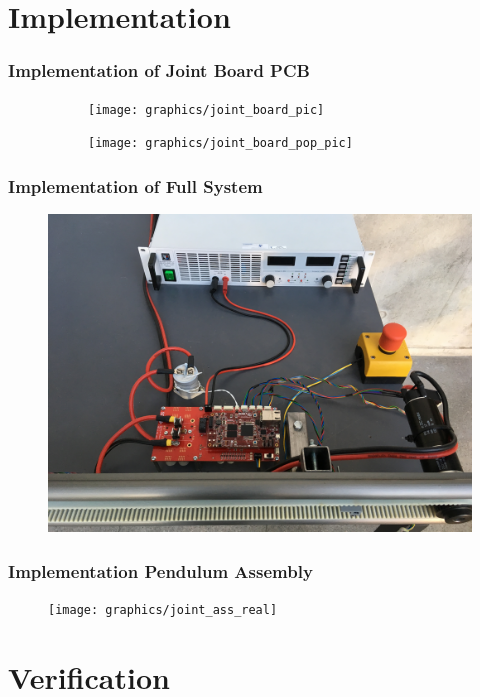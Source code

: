 \documentclass[mathserif]{beamer}
\begin{document}
\section{Implementation}

\begin{frame}[c]\frametitle{Implementation of Joint Board PCB}
\begin{figure}
	\centering
	\begin{subfigure}{.5\textwidth}
	  \centering
	  \texttt{[image: graphics/joint\_board\_pic]}
	\end{subfigure}%
	\begin{subfigure}{.5\textwidth}
	  \centering
	  \texttt{[image: graphics/joint\_board\_pop\_pic]}
	\end{subfigure}
	\end{figure}
\end{frame}

\begin{frame}[c]\frametitle{Implementation of Full System}
	\begin{figure}
		\centering
		\includegraphics[width=.9\linewidth]{graphics/full_system_finish_high}
	\end{figure}
\end{frame}

\begin{frame}[c]\frametitle{Implementation Pendulum Assembly}
	\begin{figure}
		\centering
		\texttt{[image: graphics/joint\_ass\_real]}
	\end{figure}
\end{frame}

\section{Verification}
\end{document}
